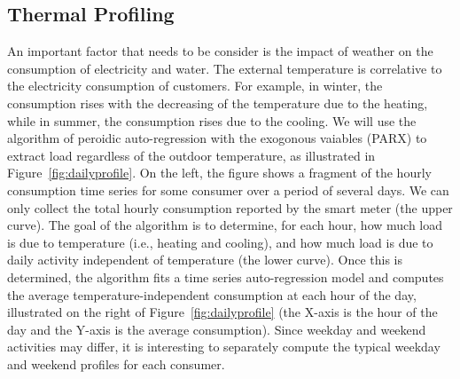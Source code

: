 \documentclass{sig-alternate}
\newcommand{\et}{et al. }
\begin{document}
\subsection{Thermal Profiling}
An important factor that needs to be consider is the impact of weather on the consumption of electricity and water. The external temperature is correlative to the electricity consumption of customers. For example, in winter, the consumption rises with the decreasing of the  temperature due to the heating, while in summer, the consumption rises  due to the cooling.  %
We will use the algorithm of peroidic auto-regression with the exogonous vaiables (PARX) \cite{omid}  to extract load regardless of the outdoor temperature, as illustrated in Figure~\ref{fig:dailyprofile}.  On the left, the figure shows a fragment of the hourly consumption time series for some consumer over a period of several days. We can only collect the total hourly consumption reported by the smart meter (the upper curve). The goal of the algorithm is to determine, for each hour, how much load is due to temperature (i.e., heating and cooling), and how much load is due to daily activity independent of temperature (the lower curve). Once this is determined, the algorithm fits a time series auto-regression model and computes the average temperature-independent consumption at each hour of the day, illustrated on the right of Figure~\ref{fig:dailyprofile} (the X-axis is the hour of the day and the Y-axis is the average consumption). Since weekday and weekend activities may differ, it is interesting to separately compute the typical weekday and weekend profiles for each consumer.
 
\end{document}
